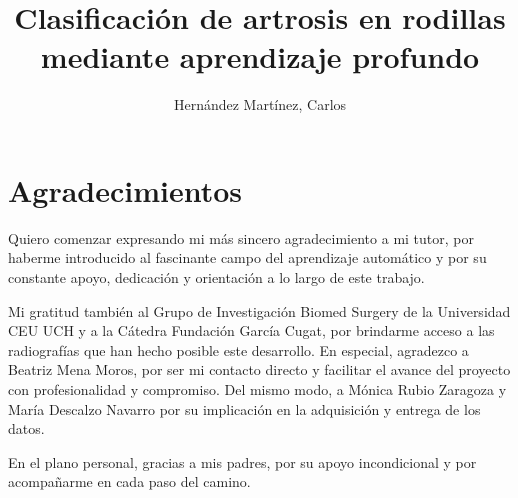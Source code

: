 \documentclass[11pt,spanish,listoffigures,listoftables]{tfgetsinf}
\title{Clasificación de artrosis en rodillas mediante aprendizaje profundo}
\author{Hernández Martínez, Carlos}
\begin{document}
\cleardoublepage
\chapter*{Agradecimientos}

Quiero comenzar expresando mi más sincero agradecimiento a mi tutor, por haberme introducido al fascinante campo del aprendizaje automático y por su constante apoyo, dedicación y orientación a lo largo de este trabajo.

Mi gratitud también al Grupo de Investigación Biomed Surgery de la Universidad CEU UCH y a la Cátedra Fundación García Cugat, por brindarme acceso a las radiografías que han hecho posible este desarrollo. En especial, agradezco a Beatriz Mena Moros, por ser mi contacto directo y facilitar el avance del proyecto con profesionalidad y compromiso. Del mismo modo, a Mónica Rubio Zaragoza y María Descalzo Navarro por su implicación en la adquisición y entrega de los datos.

En el plano personal, gracias a mis padres, por su apoyo incondicional y por acompañarme en cada paso del camino.
\end{document}
